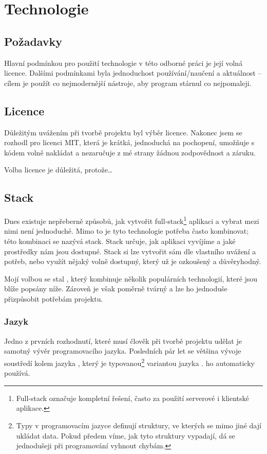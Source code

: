 \hypertarget{Technologie}{\chapter{Technologie}}

\section{Požadavky}

Hlavní podmínkou pro použití technologie v této odborné práci je její volná licence. Dalšími podmínkami byla jednoduchost používání/naučení a aktuálnost -- cílem je použít co nejmodernější nástroje, aby program stárnul co nejpomaleji.

\section{Licence}

Důležitým uvážením při tvorbě projektu byl výběr licence. Nakonec jsem se rozhodl pro licenci MIT, která je krátká, jednoduchá na pochopení, umožňuje s kódem volně nakládat a nezaručuje z mé strany žádnou zodpovědnost a záruku.\cite{choosealicense}

Volba licence je důležitá, protože\dots

\section{Stack}

Dnes existuje nepřeberně způsobů, jak vytvořit full-stack\footnote{Full-stack označuje kompletní řešení, často za použití serverové i klientské aplikace.} aplikaci a vybrat mezi nimi není jednoduché. Mimo to je tyto technologie potřeba často kombinovat; této kombinaci se nazývá stack. Stack určuje, jak aplikaci vyvíjíme a jaké prostředky nám jsou dostupné. Stack si lze vytvořit sám dle vlastního uvážení a potřeb, nebo využít nějaký volně dostupný, který už je ozkoušený a důvěryhodný.

Mojí volbou se stal , který kombinuje několik populárních technologií, které jsou blíže popsány níže. Zároveň je však poměrně tvárný a lze ho jednoduše přizpůsobit potřebám projektu.\cite{t3stack}

\subsection{Jazyk}

Jedno z prvních rozhodnutí, které musí člověk při tvorbě projektu udělat je samotný vývěr programovacího jazyka. Posledních pár let se většina vývoje soustředí kolem jazyka , který je typovanou\footnote{Typy v programovacím jazyce definují struktury, ve kterých se mimo jiné dají ukládat data. Pokud předem víme, jak tyto struktury vypadají, dá se jednodušeji při programování vyhnout chybám.} variantou jazyka .  ho automaticky používá. 

